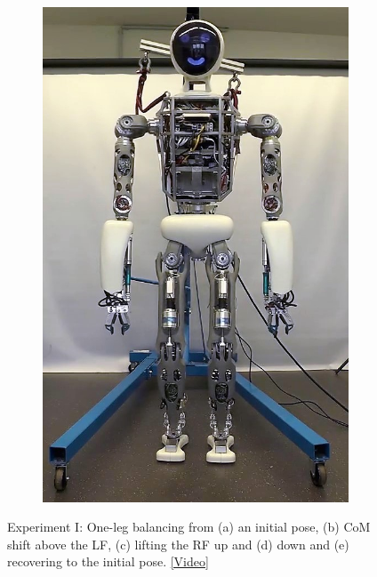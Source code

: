 \begin{figure}
\begin{subfigure}{.2\textwidth}
	\includegraphics[width=.95\linewidth]{experiments/balancing/snaps/5}
	\caption{}
	\end{subfigure}%
\caption[Experiment I: One-leg balancing]{Experiment I: One-leg balancing from (a) an initial pose, (b) \gls{CoM} shift above the \gls{LF}, (c) lifting the \gls{RF} up and (d) down and (e) recovering to the initial pose. \href{https://github.com/julesser/ma-thesis-experimental-results/blob/master/balancing/balancing.mp4}{[Video]}} 
\label{exp:balancingSnaps}
\end{figure} 

